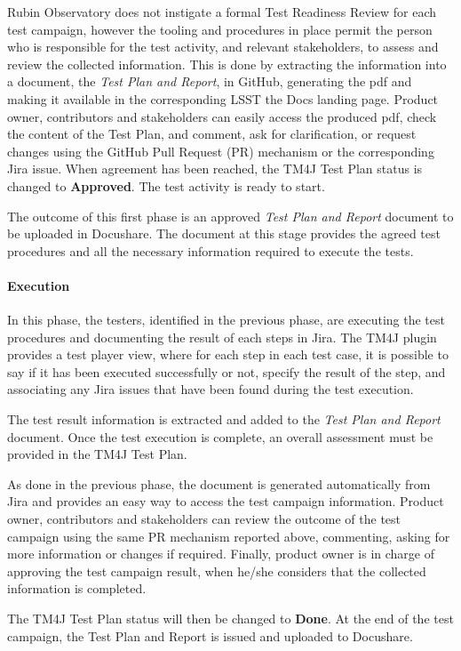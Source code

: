 Rubin Observatory does not instigate a formal Test Readiness Review for each test campaign,
however the tooling and procedures in place permit the person who is responsible for the test activity, and relevant stakeholders, to assess and review the collected information.
This is done by extracting the information into a document, the \textit{Test Plan and Report}, in GitHub, generating the pdf and making it available
in the corresponding LSST the Docs landing page. Product owner, contributors and stakeholders can easily access the produced pdf,
check the content of the Test Plan, and comment, ask for clarification, or request changes using the GitHub
Pull Request (PR) mechanism or the corresponding Jira issue.
When agreement has been reached, the TM4J Test Plan status is changed to \textbf{Approved}. The test activity is ready to start.

The outcome of this first phase is an approved \textit{Test Plan and Report} document to be uploaded in Docushare.
The document at this stage provides the agreed test procedures and all the necessary information required to execute the tests.

\paragraph{Execution}
In this phase, the testers, identified in the previous phase, are  executing the test procedures and
documenting the result of each steps in Jira.
The TM4J plugin provides a test player view, where for each step in each test case, it is possible to say if it has been executed successfully or not,
specify the result of the step, and associating any Jira issues that have been found during the test execution.

The test result information is extracted and added to the \textit{Test Plan and Report} document.
Once the test execution is complete, an overall assessment must be provided in the TM4J Test Plan.

As done in the previous phase, the document is generated automatically from Jira and provides an easy way to access the test campaign information.
Product owner, contributors and stakeholders can review the outcome of the test campaign 
using the same PR mechanism reported above, commenting, asking for more information or changes if required.
Finally, product owner is in charge of approving the test campaign result, when he/she considers that the collected information is completed.

The TM4J Test Plan status will then be changed to \textbf{Done}.
At the end of the test campaign, the Test Plan and Report is issued and uploaded to Docushare.


